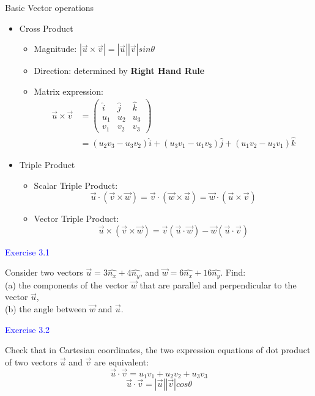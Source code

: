 \documentclass{beamer}
\begin{document}
\begin{frame}{Basic Vector operations}
  \begin{itemize}
    \item Cross Product
    \begin{itemize}
      \item Magnitude: $|\vec{u}\times \vec{v}|=|\vec{u}||\vec{v}|sin\theta$
      \item Direction: determined by \textbf{Right Hand Rule}
      \item Matrix expression:
      \begin{align*}
        \vec{u}\times \vec{v} &= \begin{pmatrix}\hat{i}&\hat{j}&\hat{k}\\u_1 & u_2 & u_3\\ v_1 & v_2 & v_3 \end{pmatrix}\\&=(u_2v_3-u_3v_2)\hat{i}+(u_3v_1-u_1v_3)\hat{j}+ (u_1v_2-u_2v_1)\hat{k}
 \end{align*}
    \end{itemize}
    \item Triple Product
    \begin{itemize}
      \item Scalar Triple Product:$$\vec{u}\cdot(\vec{v}\times \vec{w})=\vec{v}\cdot(\vec{w}\times \vec{u})=\vec{w}\cdot(\vec{u}\times \vec{v})$$
      \item Vector Triple Product:$$\vec{u}\times (\vec{v}\times \vec{w})=\vec{v}(\vec{u}\cdot\vec{w})-\vec{w}(\vec{u}\cdot \vec{v})$$
    \end{itemize}
  \end{itemize}
\end{frame}

\begin{frame}
\textcolor{blue}{Exercise 3.1}

Consider two vectors $ \vec{u}= 3\hat{n_x} +4\hat{n_y}$, and $\vec{w}= 6\hat{n_x} +16\hat{n_y}$. Find:\\
(a) the components of the vector $\vec w$ that are parallel and perpendicular
to the vector $\vec u$,\\
(b) the angle between $\vec w$ and $\vec u$.
\end{frame}

\begin{frame}
\textcolor{blue}{Exercise 3.2}

Check that in Cartesian coordinates, the two expression equations
of dot product of two vectors $\vec{u}$ and $\vec{v}$ are equivalent:$$\vec{u}\cdot \vec{v} = u_1v_1 + u_2v_2 + u_3v_3$$
$$\vec{u}\cdot \vec{v} = |\vec{u}||\vec{v}|cos\theta$$
\end{frame}
\end{document}
